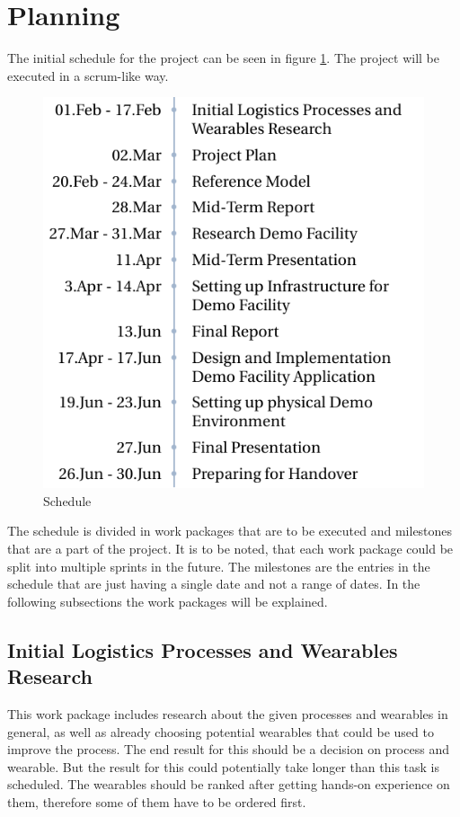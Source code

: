 \section{Planning}\label{sec:planning}
The initial schedule for the project can be seen in figure \ref{tab:schedule}. The project will be executed in a scrum-like way.

\begin{figure}[H]
	\begin{center}
		\includegraphics[scale=1]{images/schedule}
	\end{center}
\caption{Schedule}
\label{tab:schedule}
\end{figure}

The schedule is divided in work packages that are to be executed and milestones that are a part of the project. It is to be noted, that each work package could be split into multiple sprints in the future. The milestones are the entries in the schedule that are just having a single date and not a range of dates. In the following subsections the work packages will be explained.

\subsection{Initial Logistics Processes and Wearables Research}
This work package includes research about the given processes and wearables in general, as well as already choosing potential wearables that could be used to improve the process. The end result for this should be a decision on process and wearable. But the result for this could potentially take longer than this task is scheduled. The wearables should be ranked after getting hands-on experience on them, therefore some of them have to be ordered first.

